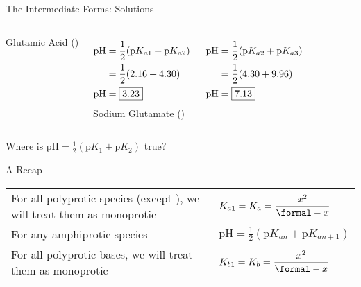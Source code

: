 \documentclass[notes=hide]{beamer}
\begin{document}
\begin{frame}{The Intermediate Forms: Solutions}
	\begin{columns}
		{\color{fg} Glutamic Acid ()}

		\begin{align*}
			\text{pH} &= \frac{1}{2}(\text{p}K_{a1} +
			\text{p}K_{a2}) \\
			&= \frac{1}{2}(2.16 + 4.30) \\
			\text{pH} &= \fbox{3.23}
		\end{align*}
		{\color{fg} Sodium Glutamate ()}

		\begin{align*}
			\text{pH} &= \frac{1}{2}(\text{p}K_{a2} +
			\text{p}K_{a3}) \\
			&= \frac{1}{2}(4.30 + 9.96) \\
			\text{pH} &= \fbox{7.13}
		\end{align*}
	\end{columns}
\end{frame}


\begin{frame}{Where is $\text{pH} = \frac{1}{2} (\text{p}K_1 + \text{p}K_2)$
	true?}

	\begin{center}
		
	\end{center}
\end{frame}


\begin{frame}{A Recap}
	\renewcommand\arraystretch{2}
	\begin{tabularx}{\linewidth} {@{}X@{\qquad}l}
		For all polyprotic species (except \ch{H2SO4}), we will treat
		them as monoprotic & $K_{a1} = K_a =
		\dfrac{x^2}{\si{\formal}-x}$ \\
		For any amphiprotic species & $\text{pH} = \frac{1}{2}(\text{p}K_{an} +
		\text{p}K_{an+1})$\\
		For all polyprotic bases, we will treat them as monoprotic &
		$K_{b1} = K_b = \dfrac{x^2}{\si{\formal}-x}$
	\end{tabularx}
\end{frame}

\end{document}
